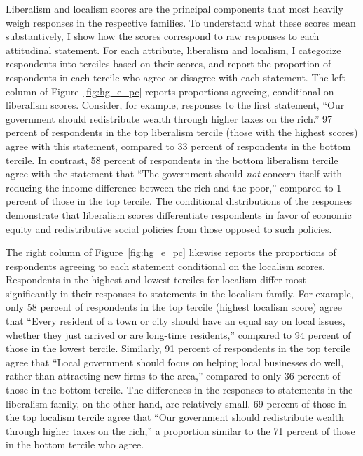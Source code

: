 \documentclass[article,12pt]{memoir}
\begin{document}
\vspace{1em}Liberalism and localism scores are the principal components that most heavily weigh responses in the respective families.  To understand what these scores mean substantively, I show how the scores correspond to raw responses to each attitudinal statement. For each attribute, liberalism and localism, I categorize respondents into terciles based on their scores, and report the proportion of respondents in each tercile who agree or disagree with each statement.  The left column of Figure~\ref{fig:hg_e_pc} reports proportions agreeing, conditional on liberalism scores.  Consider, for example, responses to the first statement, ``Our government should redistribute wealth through higher taxes on the rich.''  97 percent of respondents in the top liberalism tercile (those with the highest scores) agree with this statement, compared to 33 percent of respondents in the bottom tercile.  In contrast, 58 percent of respondents in the bottom liberalism tercile agree with the statement that ``The government should \emph{not} concern itself with reducing the income difference between the rich and the poor,'' compared to 1 percent of those in the top tercile. The conditional distributions of the responses demonstrate that liberalism scores differentiate respondents in favor of economic equity and redistributive social policies from those opposed to such policies.

The right column of Figure~\ref{fig:hg_e_pc} likewise reports the proportions of respondents agreeing to each statement conditional on the localism scores.  Respondents in the highest and lowest terciles for localism differ most significantly in their responses to statements in the localism family. For example, only 58 percent of respondents in the top tercile (highest localism score) agree that ``Every resident of a town or city should have an equal say on local issues, whether they just arrived or are long-time residents,'' compared to 94 percent of those in the lowest tercile.  Similarly, 91 percent of respondents in the top tercile agree that ``Local government should focus on helping local businesses do well, rather than attracting new firms to the area,'' compared to only 36 percent of those in the bottom tercile.  The differences in the responses to statements in the liberalism family, on the other hand, are relatively small.  69 percent of those in the top localism tercile agree that ``Our government should redistribute wealth through higher taxes on the rich,'' a proportion similar to the 71 percent of those in the bottom tercile who agree. 
\end{document}
